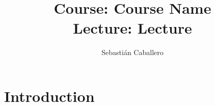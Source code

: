 \documentclass{tufte-handout}
\title{Course:  Course Name \\ Lecture: Lecture}
\author{Sebastián Caballero}
\date{}
\begin{document}
\maketitle

\section{Introduction}
\end{document}
